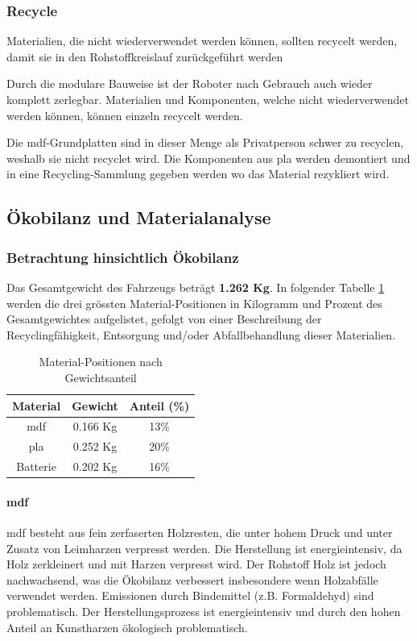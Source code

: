 \subsubsection{Recycle}

Materialien, die nicht wiederverwendet werden können, sollten
recycelt werden, damit sie in den Rohstoffkreislauf zurückgeführt werden

Durch die modulare Bauweise ist der Roboter nach Gebrauch auch wieder komplett zerlegbar. Materialien und Komponenten, welche nicht wiederverwendet werden können, können einzeln recycelt werden.

Die \acrshort{mdf}-Grundplatten sind in dieser Menge als Privatperson schwer zu recyclen, weshalb sie nicht recyclet wird. Die Komponenten aus \acrshort{pla} werden demontiert und in eine Recycling-Sammlung gegeben werden wo das Material rezykliert wird.

\subsection{Ökobilanz und Materialanalyse}

\subsubsection{Betrachtung hinsichtlich Ökobilanz}
Das Gesamtgewicht des Fahrzeugs beträgt \textbf{1.262 Kg}. In folgender Tabelle \ref{tab:kritische-mat} werden die drei grössten Material-Positionen in Kilogramm und Prozent des Gesamtgewichtes aufgelistet, gefolgt von einer Beschreibung der Recyclingfähigkeit, Entsorgung und/oder Abfallbehandlung dieser Materialien.

\begin{table}[h]
    \centering
    \begin{tabular}{c c c}
    \toprule
    Material & Gewicht  & Anteil (\%)\\
    \midrule
    \acrshort{mdf} & 0.166 Kg & 13\% \\
    \acrshort{pla} & 0.252 Kg & 20\% \\
    Batterie & 0.202 Kg & 16\%   \\
    \bottomrule
    \end{tabular}
    \caption{Material-Positionen nach Gewichtsanteil}
    \label{tab:kritische-mat}
\end{table}


\paragraph{\acrlong{mdf}}
\acrshort{mdf} besteht aus fein zerfaserten Holzresten, die unter hohem Druck und unter Zusatz von Leimharzen verpresst werden. Die Herstellung ist energieintensiv, da Holz zerkleinert und mit Harzen verpresst wird. Der Rohstoff Holz ist jedoch nachwachsend, was die Ökobilanz verbessert insbesondere wenn Holzabfälle verwendet werden. Emissionen durch Bindemittel (z.B. Formaldehyd) sind problematisch.\cite{support-2024}
Der Herstellungsprozess ist energieintensiv und durch den hohen Anteil an Kunstharzen ökologisch problematisch.

